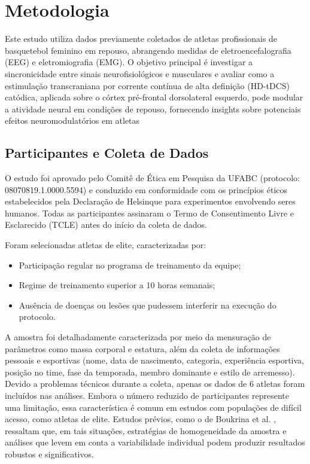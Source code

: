 \chapter{Metodologia}
\label{chap:metodologia}

Este estudo utiliza dados previamente coletados de atletas profissionais de basquetebol feminino em repouso, abrangendo medidas de eletroencefalografia (EEG) e eletromiografia (EMG). O objetivo principal é investigar a sincronicidade entre sinais neurofisiológicos e musculares e avaliar como a estimulação transcraniana por corrente contínua de alta definição (HD-tDCS) catódica, aplicada sobre o córtex pré-frontal dorsolateral esquerdo, pode modular a atividade neural em condições de repouso, fornecendo insights sobre potenciais efeitos neuromodulatórios em atletas

\section{Participantes e Coleta de Dados}

O estudo foi aprovado pelo Comitê de Ética em Pesquisa da UFABC (protocolo: 08070819.1.0000.5594) e conduzido em conformidade com os princípios éticos estabelecidos pela Declaração de Helsinque para experimentos envolvendo seres humanos. Todas as participantes assinaram o Termo de Consentimento Livre e Esclarecido (TCLE) antes do início da coleta de dados.

Foram selecionadas atletas de elite, caracterizadas por:
\begin{itemize}
    \item Participação regular no programa de treinamento da equipe;
    \item Regime de treinamento superior a 10 horas semanais;
    \item Ausência de doenças ou lesões que pudessem interferir na execução do protocolo.
\end{itemize}

A amostra foi detalhadamente caracterizada por meio da mensuração de parâmetros como massa corporal e estatura, além da coleta de informações pessoais e esportivas (nome, data de nascimento, categoria, experiência esportiva, posição no time, fase da temporada, membro dominante e estilo de arremesso). Devido a problemas técnicos durante a coleta, apenas os dados de 6 atletas foram incluídos nas análises. Embora o número reduzido de participantes represente uma limitação, essa característica é comum em estudos com populações de difícil acesso, como atletas de elite. Estudos prévios, como o de Boukrina et al. \cite{boukrina2020considerations}, ressaltam que, em tais situações, estratégias de homogeneidade da amostra e análises que levem em conta a variabilidade individual podem produzir resultados robustos e significativos.

